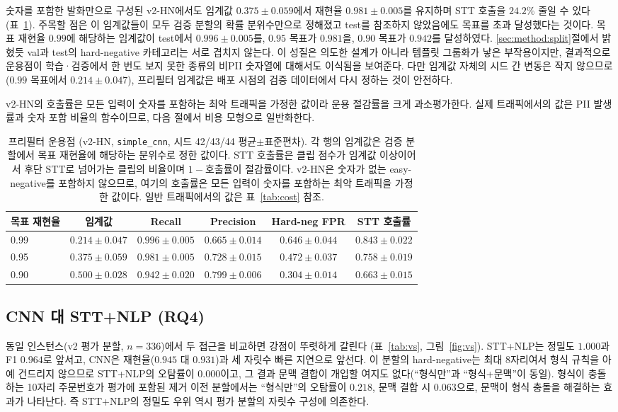 \documentclass[11pt]{article}
\begin{document}
숫자를 포함한 발화만으로 구성된 v2-HN에서도 임계값 $0.375\pm0.059$에서 재현율
$0.981\pm0.005$를 유지하며 STT 호출을 $24.2\%$ 줄일 수 있다(표~\ref{tab:prefilter}). 주목할
점은 이 임계값들이 모두 검증 분할의 확률 분위수만으로 정해졌고 test를 참조하지 않았음에도
목표를 초과 달성했다는 것이다. 목표 재현율 $0.99$에 해당하는 임계값이 test에서
$0.996\pm0.005$를, $0.95$ 목표가 $0.981$을, $0.90$ 목표가 $0.942$를 달성하였다.
\ref{sec:method:split}절에서 밝혔듯 val과 test의 hard-negative 카테고리는 서로 겹치지 않는다.
이 성질은 의도한 설계가 아니라 템플릿 그룹화가 낳은 부작용이지만, 결과적으로 운용점이
학습·검증에서 한 번도 보지 못한 종류의 비PII 숫자열에 대해서도 이식됨을 보여준다. 다만
임계값 자체의 시드 간 변동은 작지 않으므로($0.99$ 목표에서 $0.214\pm0.047$), 프리필터
임계값은 배포 시점의 검증 데이터에서 다시 정하는 것이 안전하다.

v2-HN의 호출률은 모든 입력이 숫자를 포함하는 최악 트래픽을 가정한 값이라 운용 절감률을 크게
과소평가한다. 실제 트래픽에서의 값은 PII 발생률과 숫자 포함 비율의 함수이므로, 다음 절에서
비용 모형으로 일반화한다.

\begin{table}[!htbp]
\centering
\caption{프리필터 운용점 (v2-HN, \texttt{simple\_cnn}, 시드 42/43/44 평균$\pm$표준편차). 각
행의 임계값은 검증 분할에서 목표 재현율에 해당하는 분위수로 정한 값이다. STT 호출률은 클립
점수가 임계값 이상이어서 후단 STT로 넘어가는 클립의 비율이며 $1-\text{호출률}$이 절감률이다.
v2-HN은 숫자가 없는 easy-negative를 포함하지 않으므로, 여기의 호출률은 모든 입력이 숫자를
포함하는 최악 트래픽을 가정한 값이다. 일반 트래픽에서의 값은 표~\ref{tab:cost} 참조.}
\label{tab:prefilter}
\small
\begin{tabular}{lccccc}
\toprule
목표 재현율 & 임계값 & Recall & Precision & Hard-neg FPR & STT 호출률 \\
\midrule
0.99 & $0.214\pm0.047$ & $0.996\pm0.005$ & $0.665\pm0.014$ & $0.646\pm0.044$ & $0.843\pm0.022$ \\
0.95 & $0.375\pm0.059$ & $0.981\pm0.005$ & $0.728\pm0.015$ & $0.472\pm0.037$ & $0.758\pm0.019$ \\
0.90 & $0.500\pm0.028$ & $0.942\pm0.020$ & $0.799\pm0.006$ & $0.304\pm0.014$ & $0.663\pm0.015$ \\
\bottomrule
\end{tabular}
\end{table}


\subsection{CNN 대 STT+NLP (RQ4)}
동일 인스턴스(v2 평가 분할, $n=336$)에서 두 접근을 비교하면 강점이 뚜렷하게 갈린다
(표~\ref{tab:vs}, 그림~\ref{fig:vs}). STT+NLP는 정밀도 $1.000$과 F1 $0.964$로 앞서고, CNN은
재현율($0.945$ 대 $0.931$)과 세 자릿수 빠른 지연으로 앞선다. 이 분할의 hard-negative는 최대
8자리여서 형식 규칙을 아예 건드리지 않으므로 STT+NLP의 오탐률이 $0.000$이고, 그 결과 문맥
결합이 개입할 여지도 없다(``형식만''과 ``형식+문맥''이 동일). 형식이 충돌하는 10자리
주문번호가 평가에 포함된 제거 이전 분할에서는 ``형식만''의 오탐률이 $0.218$, 문맥 결합 시
$0.063$으로, 문맥이 형식 충돌을 해결하는 효과가 나타난다. 즉 STT+NLP의 정밀도 우위 역시
평가 분할의 자릿수 구성에 의존한다.
\end{document}
